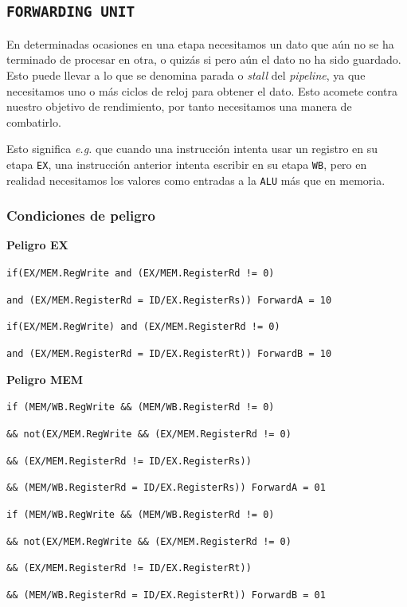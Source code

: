 \documentclass[a4paper]{article}
\begin{document}
\subsection{\texttt{FORWARDING UNIT}} \label{sec:fu}
En determinadas ocasiones en una etapa necesitamos un dato que aún no se ha terminado de procesar en otra, o quizás si pero aún el dato no ha sido guardado. Esto puede llevar a lo que se denomina parada o \textit{stall} del \textit{pipeline}, ya que necesitamos uno o más ciclos de reloj para obtener el dato. Esto acomete contra nuestro objetivo de rendimiento, por tanto necesitamos una manera de combatirlo.

Esto significa \textit{e.g.} que cuando una instrucción intenta usar un registro en su etapa \texttt{EX}, una instrucción anterior intenta escribir en su etapa \texttt{WB}, pero en realidad necesitamos los valores como entradas a la \texttt{ALU} más que en memoria.

\subsubsection{Condiciones de peligro}

\textbf{Peligro EX}

\texttt{if(EX/MEM.RegWrite and (EX/MEM.RegisterRd != 0)}

\texttt{and (EX/MEM.RegisterRd = ID/EX.RegisterRs)) ForwardA = 10}

\texttt{if(EX/MEM.RegWrite) and (EX/MEM.RegisterRd != 0)}

\texttt{and (EX/MEM.RegisterRd = ID/EX.RegisterRt)) ForwardB = 10}

\medskip

\textbf{Peligro MEM}

\texttt{if (MEM/WB.RegWrite \&\& (MEM/WB.RegisterRd !=  0)}

\texttt{\&\& not(EX/MEM.RegWrite \&\& (EX/MEM.RegisterRd != 0)}

\texttt{\&\& (EX/MEM.RegisterRd != ID/EX.RegisterRs))}

\texttt{\&\& (MEM/WB.RegisterRd = ID/EX.RegisterRs)) ForwardA = 01}

\texttt{if (MEM/WB.RegWrite \&\& (MEM/WB.RegisterRd !=  0)}

\texttt{\&\& not(EX/MEM.RegWrite \&\& (EX/MEM.RegisterRd !=  0)}

\texttt{\&\& (EX/MEM.RegisterRd !=  ID/EX.RegisterRt))}

\texttt{\&\&  (MEM/WB.RegisterRd = ID/EX.RegisterRt)) ForwardB = 01}
\end{document}

